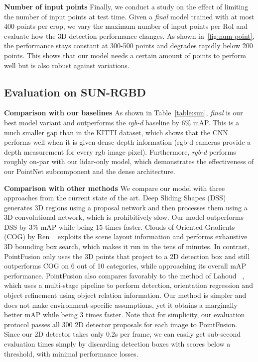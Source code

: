 \documentclass[10pt,twocolumn,letterpaper]{article}
\begin{document}
\noindent\textbf{Number of input points}
Finally, we conduct a study on the effect of limiting the number of input points at test time. Given a \textit{final} model trained with at most 400 points per crop, we vary the maximum number of input points per RoI and evaluate how the 3D detection performance changes. As shown in~\ref{fig:num-point}, the performance stays constant at 300-500 points and degrades rapidly below 200 points. This shows that our model needs a certain amount of points to perform well but is also robust against variations. 

\subsection{Evaluation on SUN-RGBD}
\textbf{Comparison with our baselines} As shown in Table~\ref{table:sun},  \textit{final} is our best model variant and  outperforms the \textit{rgb-d} baseline by 6\% mAP. This is a much smaller gap than in the KITTI dataset, which shows that the CNN performs well when it is given dense depth information (rgb-d cameras provide a depth measurement for every rgb image pixel). Furthermore, \textit{rgb-d} performs roughly on-par with our lidar-only model, which demonstrates the effectiveness of our PointNet subcomponent and the dense architecture. 

\textbf{Comparison with other methods} We compare our model with three approaches from the current state of the art. Deep Sliding Shapes (DSS)~\cite{song2016deep} generates 3D regions using a proposal network and then processes them using a 3D convolutional network, which is prohibitively slow. Our model outperforms DSS by 3\% mAP while being 15 times faster. Clouds of Oriented Gradients (COG) by Ren \etal ~\cite{ren2016three} exploits the scene layout information and performs exhaustive 3D bounding box search, which makes it run in the tens of minutes. In contrast, PointFusion only uses the 3D points that project to a 2D detection box and still outperforms COG on 6 out of 10 categories, while approaching its overall mAP performance. PointFusion also compares favorably to the method of Lahoud \etal ~\cite{lahoud20172d}, which uses a multi-stage pipeline to perform detection, orientation regression and object refinement using object relation information. Our method is simpler and does not make environment-specific assumptions, yet it obtains a marginally better mAP while being 3 times faster. Note that for simplicity, our evaluation protocol passes all 300 2D detector proposals for each image to PointFusion. Since our 2D detector takes only 0.2s per frame, we can easily get sub-second evaluation times simply by discarding detection boxes with scores below a threshold, with minimal performance losses. 
\end{document}
